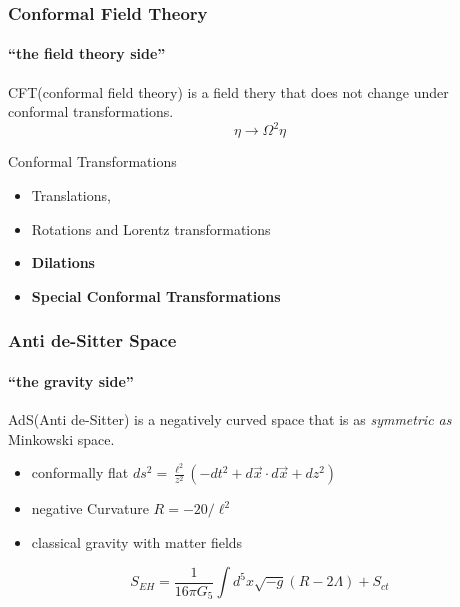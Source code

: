 \documentclass[xcolor=dvipsnames]{beamer}
\begin{document}
\begin{frame}
  \frametitle{Conformal Field Theory}
  \framesubtitle{``the field theory side''}
  \begin{block}{}
    \alert{CFT}(conformal field theory) is a field thery that does not change under conformal transformations.
    $$\eta \rightarrow \Omega^2 \eta$$
  \end{block}

  \begin{block}{Conformal Transformations}
    \begin{itemize}
      \item Translations, 
      \item Rotations and Lorentz transformations
      \item \textbf{Dilations}
      \item \textbf{Special Conformal Transformations}
    \end{itemize}
  \end{block}

\end{frame}

\begin{frame}
  \frametitle{Anti de-Sitter Space}
  \framesubtitle{``the gravity side''}

  \begin{block}{}
    \alert{AdS}(Anti de-Sitter) is a negatively curved space that is as \textit{symmetric as} Minkowski space.
  \end{block}

  \begin{itemize}
    \item conformally flat 
      $ds^2 = \frac {\ell^2}{z^2} \left( -dt^2 + d\vec x\cdot d\vec x + dz^2 \right)$
    \item negative Curvature 
      $R = -20/\ell^2$
    \item classical gravity with matter fields
  \end{itemize}

  \begin{equation*}
    S_{EH}=\frac{1}{16\pi G_5}\int d^5 x \sqrt{-g}\left(R-2\Lambda\right) +S_{ct}
  \end{equation*}

\end{frame}

\end{document}
